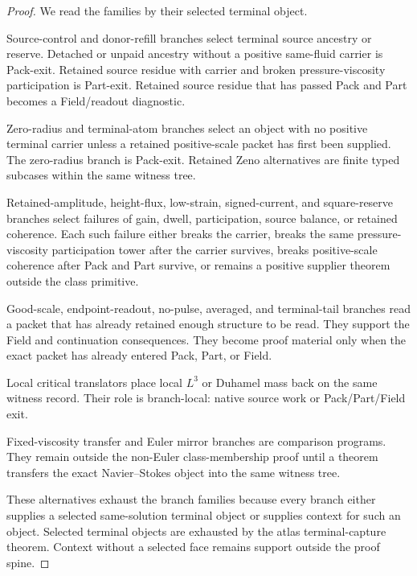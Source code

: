 \documentclass[11pt]{article}
\begin{document}
\begin{proof}
We read the families by their selected terminal object.

Source-control and donor-refill branches select terminal source ancestry or reserve.
Detached or unpaid ancestry without a positive same-fluid carrier is Pack-exit.
Retained source residue with carrier and broken pressure-viscosity participation is Part-exit.
Retained source residue that has passed Pack and Part becomes a Field/readout diagnostic.

Zero-radius and terminal-atom branches select an object with no positive terminal carrier unless a retained positive-scale packet has first been supplied.
The zero-radius branch is Pack-exit.
Retained Zeno alternatives are finite typed subcases within the same witness tree.

Retained-amplitude, height-flux, low-strain, signed-current, and square-reserve branches select failures of gain, dwell, participation, source balance, or retained coherence.
Each such failure either breaks the carrier, breaks the same pressure-viscosity participation tower after the carrier survives, breaks positive-scale coherence after Pack and Part survive, or remains a positive supplier theorem outside the class primitive.

Good-scale, endpoint-readout, no-pulse, averaged, and terminal-tail branches read a packet that has already retained enough structure to be read.
They support the Field and continuation consequences.
They become proof material only when the exact packet has already entered Pack, Part, or Field.

Local critical translators place local \(L^3\) or Duhamel mass back on the same witness record.
Their role is branch-local: native source work or Pack/Part/Field exit.

Fixed-viscosity transfer and Euler mirror branches are comparison programs.
They remain outside the non-Euler class-membership proof until a theorem transfers the exact Navier--Stokes object into the same witness tree.

These alternatives exhaust the branch families because every branch either supplies a selected same-solution terminal object or supplies context for such an object.
Selected terminal objects are exhausted by the atlas terminal-capture theorem.
Context without a selected face remains support outside the proof spine.
\end{proof}
\end{document}
